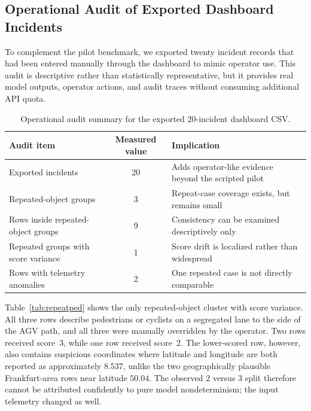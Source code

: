 \documentclass[conference]{IEEEtran}
\begin{document}
\subsection{Operational Audit of Exported Dashboard Incidents}
To complement the pilot benchmark, we exported twenty incident records that had been entered manually through the dashboard to mimic operator use. This audit is descriptive rather than statistically representative, but it provides real model outputs, operator actions, and audit traces without consuming additional API quota.

\begin{table}[t]
\caption{Operational audit summary for the exported 20-incident dashboard CSV.}
\label{tab:opsaudit}
\centering
\footnotesize
\begin{tabularx}{\linewidth}{@{}l c X@{}}
\toprule
Audit item & Measured value & Implication \\
\midrule
Exported incidents & 20 & Adds operator-like evidence beyond the scripted pilot \\
Repeated-object groups & 3 & Repeat-case coverage exists, but remains small \\
Rows inside repeated-object groups & 9 & Consistency can be examined descriptively only \\
Repeated groups with score variance & 1 & Score drift is localized rather than widespread \\
Rows with telemetry anomalies & 2 & One repeated case is not directly comparable \\
\bottomrule
\end{tabularx}
\end{table}

Table~\ref{tab:repeatped} shows the only repeated-object cluster with score variance. All three rows describe pedestrians or cyclists on a segregated lane to the side of the AGV path, and all three were manually overridden by the operator. Two rows received score~3, while one row received score~2. The lower-scored row, however, also contains suspicious coordinates where latitude and longitude are both reported as approximately \(8.537\), unlike the two geographically plausible Frankfurt-area rows near latitude \(50.04\). The observed \(2\) versus \(3\) split therefore cannot be attributed confidently to pure model nondeterminism; the input telemetry changed as well.
\end{document}
